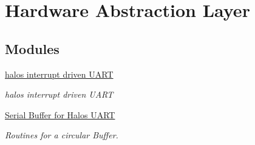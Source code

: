 \hypertarget{group__haloshal}{
\section{Hardware Abstraction Layer}
\label{group__haloshal}
}
\subsection*{Modules}
\begin{CompactItemize}
\item 
\hyperlink{group___u_a_r_t}{halos interrupt driven UART}
\begin{CompactList}\small\item\em halos interrupt driven UART \item\end{CompactList}

\item 
\hyperlink{group__serialbuffer}{Serial Buffer for Halos UART}
\begin{CompactList}\small\item\em Routines for a circular Buffer. \item\end{CompactList}

\end{CompactItemize}
